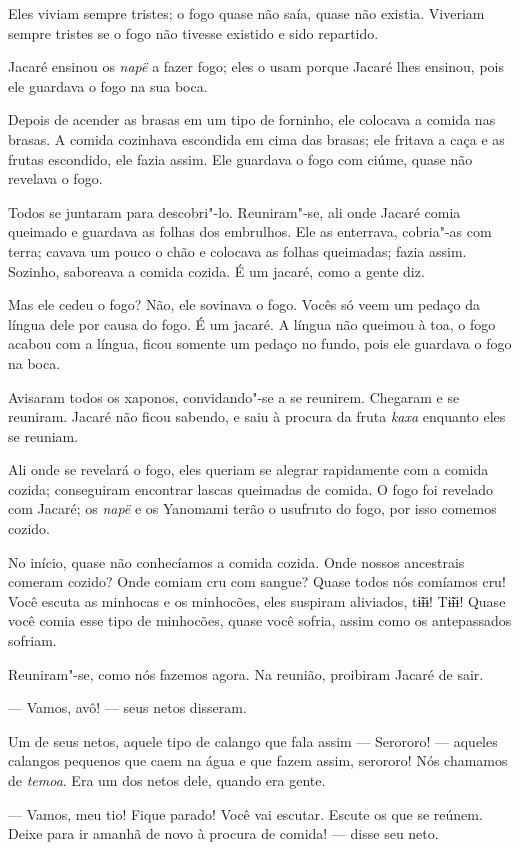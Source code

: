 Eles viviam sempre tristes; o fogo quase não saía, quase não existia.
Viveriam sempre tristes se o fogo não tivesse existido e sido
repartido. 

Jacaré ensinou os \emph{napë} a fazer fogo; eles o usam porque Jacaré
lhes ensinou, pois ele guardava o fogo na sua boca.

Depois de acender as brasas em um tipo de forninho, ele colocava a
comida nas brasas. A comida cozinhava escondida em cima das brasas; ele
fritava a caça e as frutas escondido, ele fazia assim. Ele
guardava o fogo com ciúme, quase não revelava o fogo. 

Todos se juntaram para descobri"-lo. Reuniram"-se, ali onde Jacaré comia
queimado e guardava as folhas dos embrulhos. Ele as enterrava, cobria"-as
com terra; cavava um pouco o chão e colocava as folhas queimadas; fazia assim. Sozinho, saboreava a comida cozida. É um jacaré, como a gente
diz.

Mas ele cedeu o fogo? Não, ele sovinava o fogo. Vocês só veem um pedaço
da língua dele por causa do fogo. É um jacaré. A língua não queimou à
toa, o fogo acabou com a língua, ficou somente um pedaço no fundo, pois
ele guardava o fogo na boca. 

Avisaram todos os xaponos, convidando"-se a se reunirem. Chegaram e se
reuniram. Jacaré não ficou sabendo, e saiu à procura da
fruta \emph{kaxa} enquanto eles se reuniam. 

Ali onde se revelará o fogo, eles queriam se alegrar rapidamente com a comida
cozida; conseguiram encontrar lascas queimadas de comida. O fogo foi revelado com Jacaré; os \emph{napë} e os Yanomami terão o usufruto do fogo,
por isso comemos cozido.

No início, quase não conhecíamos a comida cozida. Onde nossos ancestrais
comeram cozido? Onde comiam cru com sangue? Quase todos nós comíamos
cru! Você escuta as minhocas e os minhocões, eles suspiram
aliviados, tɨ̃ɨɨ! Tɨ̃ɨɨ! Quase você comia esse tipo de
minhocões, quase você sofria, assim como os antepassados sofriam. 

Reuniram"-se, como nós fazemos agora. Na reunião, proibiram Jacaré de sair. 

--- Vamos, avô! --- seus netos disseram. 

Um de seus netos, aquele tipo de calango que fala
assim --- Serororo! --- aqueles calangos pequenos que caem na água e
que fazem assim, serororo! Nós chamamos de \emph{temoa}. Era um
dos netos dele, quando era gente. 

--- Vamos, meu tio! Fique parado! Você vai escutar. Escute os que se
reúnem. Deixe para ir amanhã de novo à procura de comida! --- disse seu
neto. 

